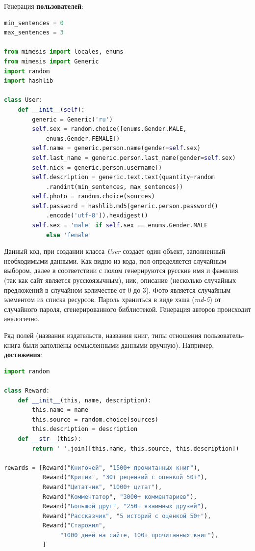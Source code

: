 \documentclass[a4paper,12pt]{article}
\begin{document}
Генерация \textbf{пользователей}:

\begin{lstlisting}[language=Python]
min_sentences = 0
max_sentences = 3

from mimesis import locales, enums
from mimesis import Generic
import random
import hashlib

class User:
    def __init__(self):
        generic = Generic('ru')
        self.sex = random.choice([enums.Gender.MALE,
            enums.Gender.FEMALE])
        self.name = generic.person.name(gender=self.sex)
        self.last_name = generic.person.last_name(gender=self.sex)
        self.nick = generic.person.username()
        self.description = generic.text.text(quantity=random
            .randint(min_sentences, max_sentences))
        self.photo = random.choice(sources) 
        self.password = hashlib.md5(generic.person.password()
            .encode('utf-8')).hexdigest()
        self.sex = 'male' if self.sex == enums.Gender.MALE 
            else 'female'
    \end{lstlisting}

Данный код, при создании класса \emph{User} создает один объект, заполненный необходимыми данными. Как видно из кода, пол определяется случайным выбором, далее в соответствии с полом генерируются русские имя и фамилия (так как сайт является русскоязычным), ник, описание (несколько случайных предложений в случайном количестве от 0 до 3). Фото является случайным элементом из списка ресурсов. Пароль храниться в виде хэша (\emph{md-5}) от случайного пароля, сгенерированного библиотекой. Генерация авторов происходит аналогично.

Ряд полей (названия издательств, названия книг, типы отношения пользователь-книга были заполнены осмысленными данными вручную). Например, \textbf{достижения}:

\begin{lstlisting}[language=Python]
import random

class Reward:
    def __init__(this, name, description):
        this.name = name
        this.source = random.choice(sources)
        this.description = description
    def __str__(this):
        return ' '.join([this.name, this.source, this.description])

rewards = [Reward("Книгочей", "1500+ прочитанных книг"),
           Reward("Критик", "30+ рецензий с оценкой 50+"),
           Reward("Цитатчик", "1000+ цитат"),
           Reward("Комментатор", "3000+ комментариев"),
           Reward("Большой друг", "250+ взаимных друзей"),
           Reward("Рассказчик", "5 историй с оценкой 50+"),
           Reward("Старожил",  
                "1000 дней на сайте, 100+ прочитанных книг"),
           ]
    \end{lstlisting}
\end{document}
